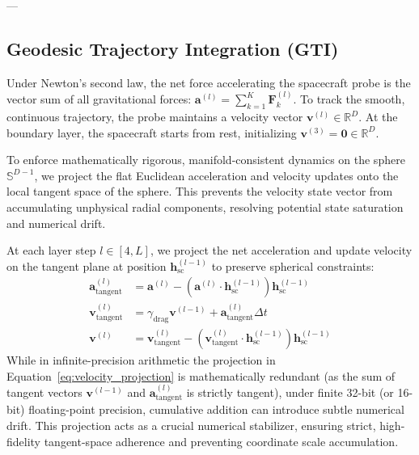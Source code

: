 ---

\vspace{-5pt}
\subsection{Geodesic Trajectory Integration (GTI)}
Under Newton's second law, the net force accelerating the spacecraft probe is the vector sum of all gravitational forces: $\mathbf{a}^{(l)} = \sum_{k=1}^K \mathbf{F}_k^{(l)}$. To track the smooth, continuous trajectory, the probe maintains a velocity vector $\mathbf{v}^{(l)} \in \mathbb{R}^D$. At the boundary layer, the spacecraft starts from rest, initializing $\mathbf{v}^{(3)} = \mathbf{0} \in \mathbb{R}^D$.

To enforce mathematically rigorous, manifold-consistent dynamics on the sphere $\mathbb{S}^{D-1}$, we project the flat Euclidean acceleration and velocity updates onto the local tangent space of the sphere. This prevents the velocity state vector from accumulating unphysical radial components, resolving potential state saturation and numerical drift.

At each layer step $l \in [4, L]$, we project the net acceleration and update velocity on the tangent plane at position $\mathbf{h}_{\text{sc}}^{(l-1)}$ to preserve spherical constraints:
\vspace{-3pt}
\begin{align}
    \mathbf{a}_{\text{tangent}}^{(l)} &= \mathbf{a}^{(l)} - \left( \mathbf{a}^{(l)} \cdot \mathbf{h}_{\text{sc}}^{(l-1)} \right) \mathbf{h}_{\text{sc}}^{(l-1)} \label{eq:acc_projection} \\
    \mathbf{v}_{\text{tangent}}^{(l)} &= \gamma_{\text{drag}} \mathbf{v}^{(l-1)} + \mathbf{a}_{\text{tangent}}^{(l)} \Delta t \label{eq:velocity_update} \\
    \mathbf{v}^{(l)} &= \mathbf{v}_{\text{tangent}}^{(l)} - \left( \mathbf{v}_{\text{tangent}}^{(l)} \cdot \mathbf{h}_{\text{sc}}^{(l-1)} \right) \mathbf{h}_{\text{sc}}^{(l-1)} \label{eq:velocity_projection}
\end{align}
\vspace{-3pt}
While in infinite-precision arithmetic the projection in Equation~\ref{eq:velocity_projection} is mathematically redundant (as the sum of tangent vectors $\mathbf{v}^{(l-1)}$ and $\mathbf{a}_{\text{tangent}}^{(l)}$ is strictly tangent), under finite 32-bit (or 16-bit) floating-point precision, cumulative addition can introduce subtle numerical drift. This projection acts as a crucial numerical stabilizer, ensuring strict, high-fidelity tangent-space adherence and preventing coordinate scale accumulation.

